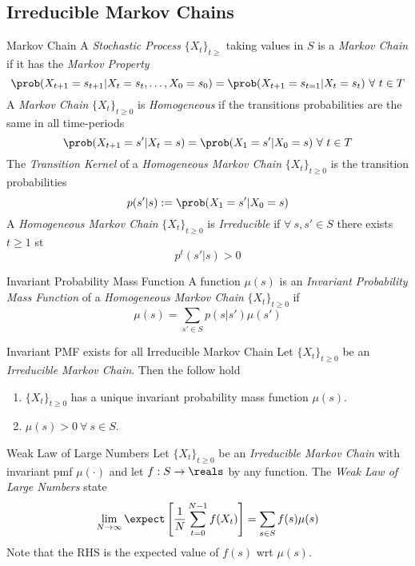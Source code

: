 \documentclass[11pt,a4paper]{article}
\begin{document}
\subsection{Irreducible Markov Chains} %

  \begin{definition}{Markov Chain}
    A \textit{Stochastic Process} $\{X_t\}_{t\geq}$ taking values in $S$ is a \textit{Markov Chain} if it has the \textit{Markov Property}
    \[ \prob(X_{t+1}=s_{t+1}|X_t=s_t,\dots,X_0=s_0)=\prob(X_{t+1}=s_{t=1}|X_t=s_t)\ \forall\ t\in T \]
    A \textit{Markov Chain} $\{X_t\}_{t\geq0}$ is \textit{Homogeneous} if the transitions probabilities are the same in all time-periods
    \[ \prob(X_{t+1}=s'|X_t=s)=\prob(X_1=s'|X_0=s)\ \forall\ t\in T \]
    The \textit{Transition Kernel} of a \textit{Homogeneous Markov Chain} $\{X_t\}_{t\geq0}$ is the transition probabilities
    \[ p(s'|s):=\prob(X_1=s'|X_0=s) \]
    A \textit{Homogeneous Markov Chain} $\{X_t\}_{t\geq0}$ is \textit{Irreducible} if $\forall\ s,s'\in S$ there exists $t\geq 1$ st
    \[ p^t(s'|s)>0 \]
  \end{definition}

  \begin{definition}{Invariant Probability Mass Function}
    A function $\mu(s)$ is an \textit{Invariant Probability Mass Function} of a \textit{Homogeneous Markov Chain} $\{X_t\}_{t\geq0}$ if
    \[ \mu(s)=\sum_{s'\in S}p(s|s')\mu(s') \]
  \end{definition}

  \begin{theorem}{Invariant PMF exists for all Irreducible Markov Chain}
    Let $\{X_t\}_{t\geq0}$ be an \textit{Irreducible Markov Chain}. Then the follow hold
    \begin{enumerate}
      \item $\{X_t\}_{t\geq0}$ has a unique invariant probability mass function $\mu(s)$.
      \item $\mu(s)>0\ \forall\ s\in S$.
    \end{enumerate}
  \end{theorem}

  \begin{theorem}{Weak Law of Large Numbers}
    Let $\{X_t\}_{t\geq0}$ be an \textit{Irreducible Markov Chain} with invariant pmf $\mu(\cdot)$ and let $f:S\to\reals$ by any function. The \textit{Weak Law of Large Numbers} state
    \[ \lim_{N\to\infty}\expect\left[\frac1N\sum_{t=0}^{N-1}f(X_t)\right]=\sum_{s\in S}f(s)\mu(s) \]
    Note that the RHS is the expected value of $f(s)$ wrt $\mu(s)$.
  \end{theorem}
\end{document}

